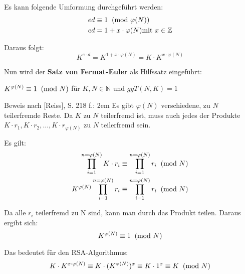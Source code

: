 Es kann folgende Umformung durchgeführt werden:
\begin{align*}
ed &\equiv 1 \imod{\varphi(N)}\\
ed &= 1 + x \cdot \varphi(N) \text{mit } x \in \mathbb{Z}
\end{align*}

Daraus folgt:
\[K^{e \cdot d} = K^{1 + x \cdot \varphi(N)} = K \cdot K^{x \cdot \varphi(N)}\]

Nun wird der \textbf{Satz von Fermat-Euler} als Hilfssatz eingeführt:
\begin{mdframed}[tikzsetting={draw=red,ultra thick}, innertopmargin=0.6cm]
$K^{\varphi(N)} \equiv 1 \imod{N}$  für $K, N \in \mathbb{N}$ und $ggT(N, K) = 1$
\end{mdframed}

Beweis nach [Reiss], S. 218 f.:
\hangindent2em
Es gibt $\varphi(N)$ verschiedene, zu $N$ teilerfremde Reste. Da $K$ 
zu $N$ teilerfremd ist, muss auch jedes der Produkte 
$K \cdot r_1 , K \cdot r_2 , \dots, K \cdot r_{\varphi(N)}$ zu $N$ 
teilerfremd sein. 

Es gilt:
\begin{align*}
\prod_{i=1}^{n=\varphi(N)} K \cdot r_i &\equiv \prod_{i=1}^{n=\varphi(N)} r_i \imod{N}\\
K^{\varphi(N)} \prod_{i=1}^{n=\varphi(N)} r_i &\equiv \prod_{i=1}^{n=\varphi(N)} r_i \imod{N}
\end{align*}

Da alle $r_i$ teilerfremd zu N sind, kann man durch das Produkt teilen. Daraus ergibt sich: 
\[K^{\varphi(N)} \equiv 1 \imod{N}\]

Das bedeutet für den RSA-Algorithmus:
\[K \cdot K^{x \cdot \varphi(N)}  \equiv K \cdot (K^{\varphi(N)})^x \equiv K \cdot 1^x \equiv K \imod{N}\]
	
